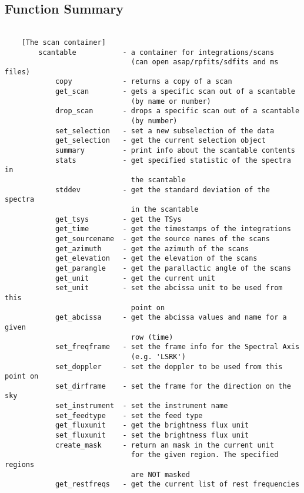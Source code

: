 \documentclass[11pt]{article}
\begin{document}
\subsection{Function Summary}

%
\begin{verbatim}

    [The scan container]
        scantable           - a container for integrations/scans
                              (can open asap/rpfits/sdfits and ms files)
            copy            - returns a copy of a scan
            get_scan        - gets a specific scan out of a scantable
                              (by name or number)
            drop_scan       - drops a specific scan out of a scantable
                              (by number)
            set_selection   - set a new subselection of the data
            get_selection   - get the current selection object
            summary         - print info about the scantable contents
            stats           - get specified statistic of the spectra in
                              the scantable
            stddev          - get the standard deviation of the spectra
                              in the scantable
            get_tsys        - get the TSys
            get_time        - get the timestamps of the integrations
            get_sourcename  - get the source names of the scans
            get_azimuth     - get the azimuth of the scans
            get_elevation   - get the elevation of the scans
            get_parangle    - get the parallactic angle of the scans
            get_unit        - get the current unit
            set_unit        - set the abcissa unit to be used from this
                              point on
            get_abcissa     - get the abcissa values and name for a given
                              row (time)
            set_freqframe   - set the frame info for the Spectral Axis
                              (e.g. 'LSRK')
            set_doppler     - set the doppler to be used from this point on
            set_dirframe    - set the frame for the direction on the sky
            set_instrument  - set the instrument name
            set_feedtype    - set the feed type
            get_fluxunit    - get the brightness flux unit
            set_fluxunit    - set the brightness flux unit
            create_mask     - return an mask in the current unit
                              for the given region. The specified regions
                              are NOT masked
            get_restfreqs   - get the current list of rest frequencies

\end{verbatim}
\end{document}
